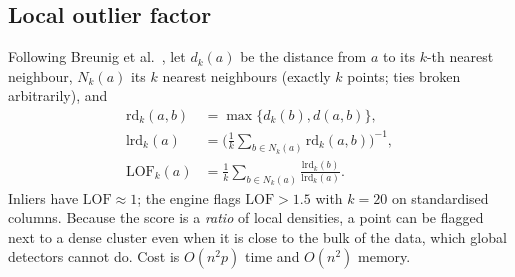 \documentclass[conference]{IEEEtran}
\begin{document}
\subsection{Local outlier factor}
Following Breunig et al.\ \cite{breunig2000}, let $d_k(a)$ be the distance from $a$ to its $k$-th nearest neighbour, $N_k(a)$ its $k$ nearest neighbours (exactly $k$ points; ties broken arbitrarily), and
\begin{align}
\mathrm{rd}_k(a,b)&=\max\{d_k(b),d(a,b)\},\\
\mathrm{lrd}_k(a)&=\Big(\tfrac1k\textstyle\sum_{b\in N_k(a)}\mathrm{rd}_k(a,b)\Big)^{-1},\\
\mathrm{LOF}_k(a)&=\frac1k\sum_{b\in N_k(a)}\frac{\mathrm{lrd}_k(b)}{\mathrm{lrd}_k(a)}.
\end{align}
Inliers have $\mathrm{LOF}\approx1$; the engine flags $\mathrm{LOF}>1.5$ with $k=20$ on standardised columns. Because the score is a \emph{ratio} of local densities, a point can be flagged next to a dense cluster even when it is close to the bulk of the data, which global detectors cannot do. Cost is $O(n^2p)$ time and $O(n^2)$ memory.
\end{document}
